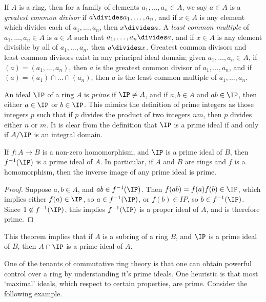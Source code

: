 \begin{example}
    If $A$ is a ring, then for a family of elements $a_1, \dots, a_n \in A$, we say $a \in A$ is a \emph{greatest common divisor} if $a \divides a_1, \dots, a_n$, and if $x \in A$ is any element which divides each of $a_1, \dots, a_n$, then $x \divides a$. A \emph{least common multiple} of $a_1, \dots, a_n \in A$ is $a \in A$ such that $a_1, \dots, a_n \divides a$, and if $x \in A$ is any element divisible by all of $a_1, \dots, a_n$, then $a \divides x$. Greatest common divisors and least common divisors exist in any principal ideal domain; given $a_1, \dots, a_n \in A$, if $(a) = (a_1, \dots, a_n)$, then $a$ is the greatest common divisor of $a_1, \dots, a_n$, and if $(a) = (a_1) \cap \dots \cap (a_n)$, then $a$ is the least common multiple of $a_1, \dots, a_n$.
\end{example}

An ideal $\IP$ of a ring $A$ is \emph{prime} if $\IP \neq A$, and if $a,b \in A$ and $ab \in \IP$, then either $a \in \IP$ or $b \in \IP$. This mimics the definition of prime integers as those integers $p$ such that if $p$ divides the product of two integers $nm$, then $p$ divides either $n$ or $m$. It is clear from the definition that $\IP$ is a prime ideal if and only if $A/\IP$ is an integral domain.

\begin{theorem}
    If $f: A \to B$ is a non-zero homomorphism, and $\IP$ is a prime ideal of $B$, then $f^{-1}(\IP)$ is a prime ideal of $A$. In particular, if $A$ and $B$ are rings and $f$ is a homomorphism, then the inverse image of any prime ideal is prime.
\end{theorem}
\begin{proof}
    Suppose $a,b \in A$, and $ab \in f^{-1}(\IP)$. Then $f(ab) = f(a)f(b) \in \IP$, which implies either $f(a) \in \IP$, so $a \in f^{-1}(\IP)$, or $f(b) \in IP$, so $b \in f^{-1}(\IP)$. Since $1 \not \in f^{-1}(\IP)$, this implies $f^{-1}(\IP)$ is a proper ideal of $A$, and is therefore prime.
\end{proof}

\begin{remark}
    This theorem implies that if $A$ is a subring of a ring $B$, and $\IP$ is a prime ideal of $B$, then $A \cap \IP$ is a prime ideal of $A$.
\end{remark}

One of the tenants of commutative ring theory is that one can obtain powerful control over a ring by understanding it's prime ideals. One heuristic is that most `maximal' ideals, which respect to certain properties, are prime. Consider the following example.

